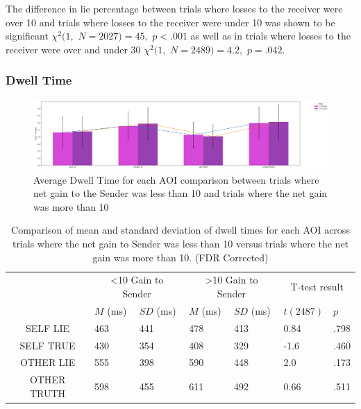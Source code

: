 \documentclass[man, floatsintext]{apa7}
\begin{document}
The difference in lie percentage between trials where losses to the receiver were over 10 and trials where losses to the receiver were under 10 was shown to be significant $\chi^2(1,$ $N=2027) = 45,$ $p<.001$ as well as in trials where losses to the receiver were over and under 30 $\chi^2(1,$ $N=2489) = 4.2,$ $p=.042$.

\subsubsection{Dwell Time}

\begin{figure}[H]
	\includegraphics[width=\linewidth]{../plots/RESPONSE/AvgDwellPerGain.png}
	\caption{Average Dwell Time for each AOI comparison between trials where net gain to the Sender was less than 10 and trials where the net gain was more than 10}
	\label{fig:AvgDwellPerGain}
\end{figure}

\begin{table}[H]
	\centering
	\begin{tabular}{|c|p{1.5cm}|p{2cm}|p{1.5cm}|p{2cm}|p{2cm}|p{1.5cm}|}
		\hline
		\multirow{2}{*}{} & \multicolumn{2}{c|}{<10 Gain to Sender} & \multicolumn{2}{c|}{>10 Gain to Sender} & \multicolumn{2}{c|}{T-test result} \\ \cline{2-7}
		& $M$ (ms) &$SD$ (ms) & $M$ (ms) & $SD$ (ms) & $t(2487)$ & $p$ \\ \hline
		SELF LIE& 463 & 441 & 478 & 413 & 0.84 & .798  \\ \hline
		SELF TRUE & 430 & 354 & 408 & 329 & -1.6 & .460  \\ \hline
		OTHER LIE & 555 & 398 & 590 & 448 & 2.0 & .173 \\ \hline
		OTHER TRUTH & 598 & 455 & 611 & 492 & 0.66 & .511 \\ \hline
	\end{tabular}
	\vspace{0.3cm}
	\caption{Comparison of mean and standard deviation of dwell times for each AOI across trials where the net gain to Sender was less than 10 versus trials where the net gain was more than 10. (FDR Corrected)}
	\label{tab:NetGainDwell}
\end{table}
\end{document}
